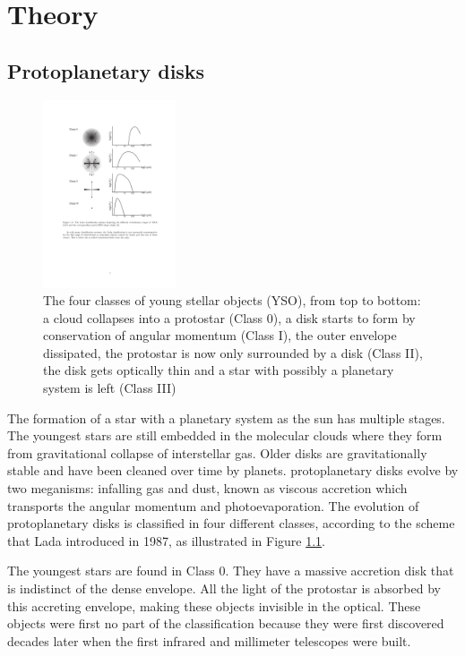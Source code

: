\documentclass[twoside,single]{lion-msc}
\begin{document}
\chapter{Theory}
\section{Protoplanetary disks}
\begin{figure}
\includegraphics[trim={4cm 11cm 11cm 4cm},clip,width = 0.35\textwidth]{classscheme}
\caption{The four classes of young stellar objects (YSO), from top to bottom: a cloud collapses into a protostar (Class 0), a disk starts to form by conservation of angular momentum (Class I), the outer envelope dissipated, the protostar is now only surrounded by a disk (Class II), the disk gets optically thin and a star with possibly a planetary system is left (Class III)}
\vspace{-60pt}
\label{fig:classscheme}
\end{figure}%

The formation of a star with a planetary system as the sun has multiple stages. The youngest stars are still embedded in the molecular clouds where they form from gravitational collapse of interstellar gas. Older disks are gravitationally stable and have been cleaned over time by planets. protoplanetary disks evolve by two meganisms: infalling gas and dust, known as viscous accretion which transports the angular momentum and photoevaporation. The evolution of protoplanetary disks is classified in four different classes, according to the scheme that Lada introduced in 1987, as illustrated in Figure \ref{fig:classscheme}. 
\bigskip

The youngest stars are found in Class 0. They have a massive accretion disk that is indistinct of the dense envelope. All the light of the protostar is absorbed by this accreting envelope, making these objects invisible in the optical. These objects were first no part of the classification because they were first discovered decades later when the first infrared and millimeter telescopes were built.
\bigskip
\end{document}

